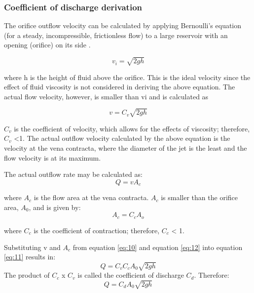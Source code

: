 \subsubsection{Coefficient of discharge derivation}

The orifice outflow velocity can be calculated by applying Bernoulli’s equation (for a steady, incompressible, frictionless flow) to a large reservoir with an opening (orifice) on its side \cite{morrison1990flow}.

\begin{equation}
\label{eq:9}
v_{i}=\sqrt{2 g h}
\end{equation}

where h is the height of fluid above the orifice. This is the ideal velocity since the effect of fluid viscosity is not considered in deriving the above equation. The actual flow velocity, however, is smaller than vi and is calculated as

\begin{equation}
\label{eq:10}
v=C_{v} \sqrt{2 g h}
\end{equation}

$C_{v}$ is the coefficient of velocity, which allows for the effects of viscosity; therefore, $C_{v}$ <1. The actual outflow velocity calculated by the above equation is the velocity at the vena contracta, where the diameter of the jet is the least and the flow velocity is at its maximum.

The actual outflow rate may be calculated as:
\begin{equation}
\label{eq:11}
Q=v A_{c}
\end{equation}

where $A_{c}$ is the flow area at the vena contracta. $A_{c}$ is smaller than the orifice area, $A_{0}$, and is given by:
\begin{equation}
\label{eq:12}
A_{c}=C_{c} A_{o}
\end{equation}

where $C_{c}$ is the coefficient of contraction; therefore, $C_{c}$ < 1.

Substituting v and $A_{c}$ from equation \ref{eq:10} and equation \ref{eq:12} into equation \ref{eq:11} results in:
\begin{equation}
\label{eq:13}
Q=C_{v} C_{c} A_{0} \sqrt{2 g h}
\end{equation}
The product of $C_{c}$ x $C_{v}$  is called the coefficient of discharge $C_{d}$. Therefore:
\begin{equation}
\label{eq:14}
Q=C_{d} A_{0} \sqrt{2 g h}
\end{equation}

